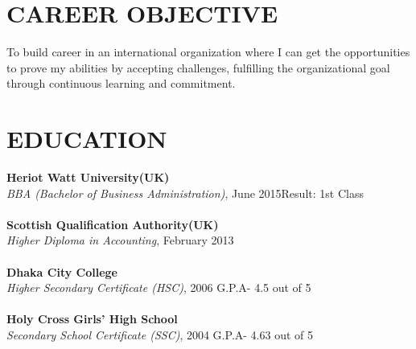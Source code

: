 \documentclass[margin]{res}
\begin{document}
\begin{resume}
%
\section{CAREER OBJECTIVE}
\par
To build career in an international organization where I can get the opportunities to prove my abilities by accepting challenges, fulfilling the organizational goal through continuous learning and commitment.




\section{EDUCATION}
\textbf{Heriot Watt University(UK)}\\
{\sl BBA (Bachelor of Business Administration)}, June 2015\hfill Result: 
1st Class
\\ \\
\textbf{Scottish Qualification Authority(UK)}\\
{\sl Higher Diploma in Accounting}, February 2013 
\\ \\
\textbf{Dhaka City College}\\
{\sl Higher Secondary Certificate (HSC)}, 2006 \hfill G.P.A- 4.5 out of 5
\\ \\
\textbf{Holy Cross Girls' High School}\\
{\sl Secondary School Certificate (SSC)}, 2004 \hfill G.P.A- 4.63 out of 5




\end{resume}
\end{document}
